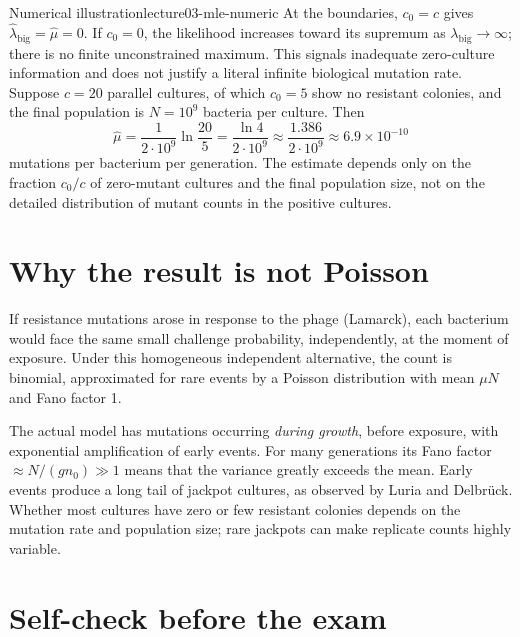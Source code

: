 \begin{example}{Numerical illustration}{lecture03-mle-numeric}
At the boundaries, $c_0=c$ gives $\hat\lambda_{\mathrm{big}}=\hat\mu=0$. If $c_0=0$, the likelihood increases toward its supremum as $\lambda_{\mathrm{big}}\to\infty$; there is no finite unconstrained maximum. This signals inadequate zero-culture information and does not justify a literal infinite biological mutation rate.
Suppose $c=20$ parallel cultures, of which $c_0=5$ show no resistant colonies, and the final population is $N=10^{9}$ bacteria per culture. Then
\begin{equation}\label{eq:lecture03-mle-numeric}
\hat{\mu} = \frac{1}{2\cdot10^{9}}\ln\!\frac{20}{5}
= \frac{\ln 4}{2\cdot10^{9}}
\approx \frac{1.386}{2\cdot10^{9}}
\approx 6.9\times10^{-10}
\end{equation}
mutations per bacterium per generation. The estimate depends only on the fraction $c_0/c$ of zero-mutant cultures and the final population size, not on the detailed distribution of mutant counts in the positive cultures.
\end{example}

\section{Why the result is not Poisson}\label{sec:lecture03-not-poisson}

If resistance mutations arose in response to the phage (Lamarck), each bacterium would face the same small challenge probability, independently, at the moment of exposure. Under this homogeneous independent alternative, the count is binomial, approximated for rare events by a Poisson distribution with mean $\mu N$ and Fano factor 1.

The actual model has mutations occurring \emph{during growth}, before exposure, with exponential amplification of early events. For many generations its Fano factor $\approx N/(g n_0)\gg1$ means that the variance greatly exceeds the mean. Early events produce a long tail of jackpot cultures, as observed by Luria and Delbr{\"u}ck. Whether most cultures have zero or few resistant colonies depends on the mutation rate and population size; rare jackpots can make replicate counts highly variable.

\section{Self-check before the exam}\label{sec:lecture03-selfcheck}

